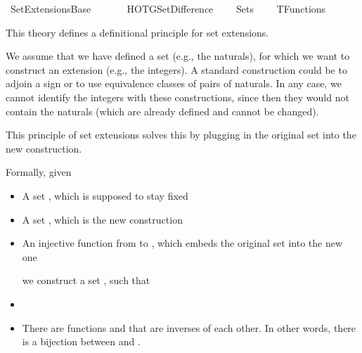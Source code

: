 %
\begin{isabellebody}%
%
%
\isadelimdocument
%
\endisadelimdocument
%
\isatagdocument
\isanewline
%
\isamarkuptrue%
%
\endisatagdocument
{\isafolddocument}%
%
\isadelimdocument
%
\endisadelimdocument
%
\isadelimtheory
%
\endisadelimtheory
%
\isatagtheory
{}\isamarkupfalse%
\ Set{\isacharunderscore}{\kern0pt}Extensions{\isacharunderscore}{\kern0pt}Base\isanewline
\ \ \isanewline
\ \ \ \ HOTG{\isachardot}{\kern0pt}Set{\isacharunderscore}{\kern0pt}Difference\isanewline
\ \ \ \ Sets\isanewline
\ \ \ \ TFunctions\isanewline
{}%
\endisatagtheory
{\isafoldtheory}%
%
\isadelimtheory
%
\endisadelimtheory
%
\begin{isamarkuptext}%
This theory defines a definitional principle for set extensions.

We assume that we have defined a set  (e.g., the naturals), for which we
want to construct an extension (e.g., the integers). A standard construction
could be to adjoin a sign or to use equivalence classes of pairs of naturals.
In any case, we cannot identify the integers with these constructions, since
then they would not contain the naturals (which are already defined and cannot
be changed).

This principle of set extensions solves this by plugging in the original set
into the new construction.

Formally, given

%
\begin{itemize}%
\item A set , which is supposed to stay fixed

\item A set , which is the new construction

\item An injective function from  to , which embeds the original set into
the new one

we construct a set , such that

\item {}

\item There are functions  and
 that are inverses of each other.
In other words, there is a bijection between  and .


\end{itemize}
\end{isamarkuptext}
\end{isabellebody}
